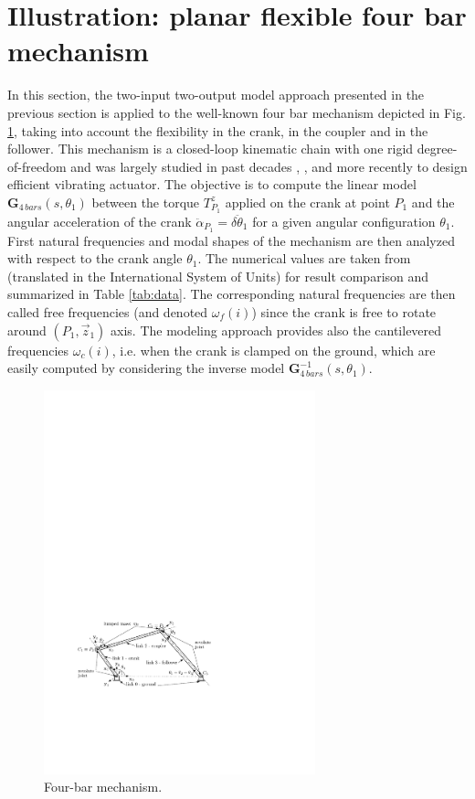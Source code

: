 \documentclass[smallcondensed]{svjour3}     %
\begin{document}
\section{Illustration: planar flexible four bar mechanism}\label{sect:fb}
In this section, the two-input two-output model approach presented in the previous section is applied to the well-known four bar mechanism depicted in Fig. \ref{fig:4bars}, taking into account the flexibility in the crank, in the coupler and in the follower. This mechanism is a closed-loop kinematic chain with one rigid degree-of-freedom and was largely studied in past decades \cite{Kitis1990267},  \cite{shigley1980}, \cite{Turcic1984} and more recently \cite{Sitti2003} to design efficient vibrating actuator. The objective is to compute the linear model $\mathbf{G}_{4\,bars}(s,\theta_1)$ between the torque $T^z_{P_1}$  applied on the crank at point $P_1$ and the angular acceleration of the crank $\ddot{\alpha}_{P_1}=\delta\ddot{\theta}_1$ for a given angular configuration $\theta_1$. First natural frequencies and modal shapes of the mechanism are then analyzed with respect to the crank angle $\theta_1$. The numerical values are taken from  \cite{Kitis1990267} (translated in the International System of Units) for result comparison and summarized in Table \ref{tab:data}.
The corresponding natural frequencies are then called free frequencies (and denoted $\omega_f(i)$) since the crank is free to rotate around $(P_1,\vec{z}_1)$ axis. The modeling approach provides also the cantilevered frequencies  $\omega_c(i)$, i.e. when the crank is clamped on the ground, which are easily computed by considering the inverse model $\mathbf{G}_{4\,bars}^{-1}(s,\theta_1)$.

\begin{figure}[htbp!]
  \includegraphics[width=0.7\textwidth]{fourbars}
\caption{Four-bar mechanism.}
\label{fig:4bars} 
\end{figure}
\end{document}
